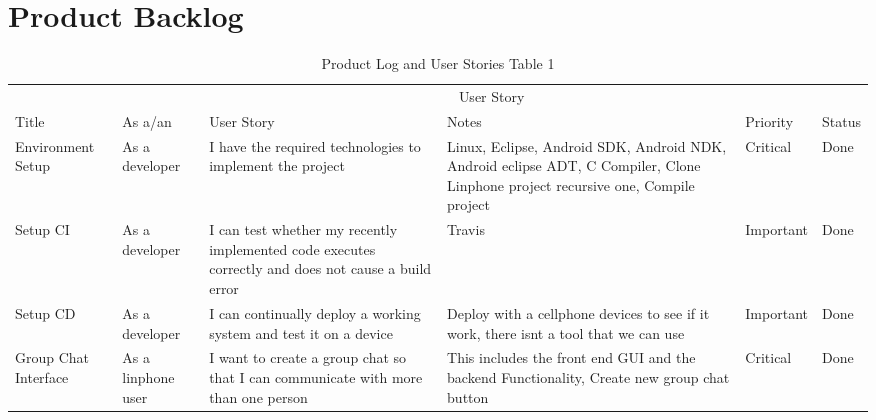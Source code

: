 \documentclass[a4paper]{article}
\begin{document}
\section{Product Backlog}
\begin{table} 
\begin{tabular}{p{1.5cm} p{2.5cm} p{3cm} p{3cm} p{1cm} p{1cm}} %
\hline %
& \multicolumn{5}{c}{User Story} \\ %
\cmidrule(l){2-6} %
Title & As a/an & User Story & Notes & Priority & Status\\ %
\hline %
Environment Setup & As a developer & I have the required technologies to implement the project & Linux, Eclipse, Android SDK, Android NDK, Android eclipse ADT, C Compiler, Clone Linphone project recursive one, Compile project  & Critical & Done\\ \cmidrule(l){2-6} %
Setup CI & As a developer & I can test whether my recently implemented code executes correctly and does not cause a build error & Travis & Important & Done\\ \cmidrule(l){2-6}%
Setup CD & As a developer & I can continually deploy a working system and test it on a device & Deploy with a cellphone devices to see if it work, there isnt a tool that we can use & Important & Done\\ \cmidrule(l){2-6} %
Group Chat Interface & As a linphone user & I want to create a group chat so that I can communicate with more than one person  & This includes the front end GUI and the backend Functionality, Create new group chat button & Critical & Done\\ %

\midrule %
\midrule %
\end{tabular}
\caption{Product Log and User Stories Table 1} %
\label{tab:template} %
\end{table}
\end{document}
